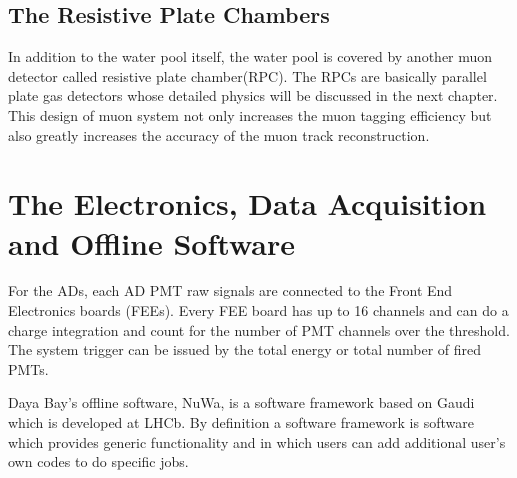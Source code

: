 \subsection{The Resistive Plate Chambers}

In addition to the water pool itself, the water pool is covered by another muon detector called resistive plate chamber(RPC). The RPCs are basically parallel plate gas detectors whose detailed physics will be discussed in the next chapter. This design of muon system not only increases the muon tagging efficiency but also greatly increases the accuracy of the muon track reconstruction.



\section{The Electronics, Data Acquisition and Offline Software}

For the ADs, each AD PMT raw signals are connected to the Front End Electronics boards (FEEs). Every FEE board has up to 16 channels and can do a charge integration and count for the number of PMT channels over the threshold. The system trigger can be issued by the total energy or total number of fired PMTs.

Daya Bay's offline software, NuWa, is a software framework based on Gaudi which is developed at LHCb. By definition a software framework is software which provides generic functionality and in which users can add additional user's own codes to do specific jobs.